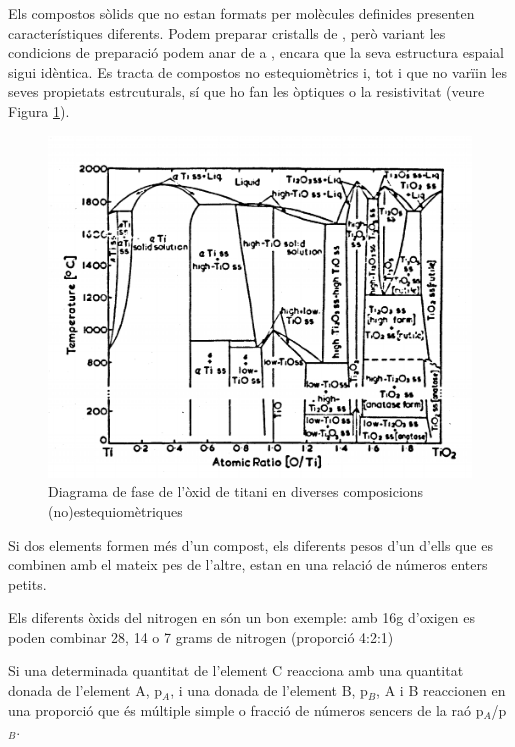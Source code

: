 Els compostos sòlids que no estan formats per molècules definides presenten característiques diferents. Podem preparar cristalls de , però variant les condicions de preparació podem anar de  a , encara que la seva estructura espaial sigui idèntica. Es tracta de compostos no estequiomètrics i, tot i que no varïin les seves propietats estrcuturals, sí que ho fan les òptiques o la resistivitat (veure Figura \ref{fig:TiOPhaseDiagram}).
\begin{figure}[h]
\centering
\includegraphics[scale=0.35]{figures/TiOPhaseDiagram.png}
\caption{Diagrama de fase de l'òxid de titani en diverses composicions (no)estequiomètriques\cite{de_vries_phase_1954}}
\label{fig:TiOPhaseDiagram}
\end{figure}

\begin{mdframed}[backgroundcolor=gray!30,frametitle=Llei de les proporcions múltiples]
Si dos elements formen més d'un compost, els diferents pesos d'un d'ells que es combinen amb el mateix pes de l'altre, estan en una relació de números enters petits.
\end{mdframed}

Els diferents òxids del nitrogen en són un bon exemple: amb 16g d'oxigen es poden combinar 28, 14 o 7 grams de nitrogen (proporció 4:2:1)

\begin{mdframed}[backgroundcolor=gray!30,frametitle=Llei de les proporcions equivalents]
Si una determinada quantitat de l'element C reacciona amb una quantitat donada de l'element A, p$_A$, i una donada de l'element B, p$_B$, A i B reaccionen en una proporció que és múltiple simple o fracció de números sencers de la raó p$_A$/p$_B$.
\end{mdframed}

